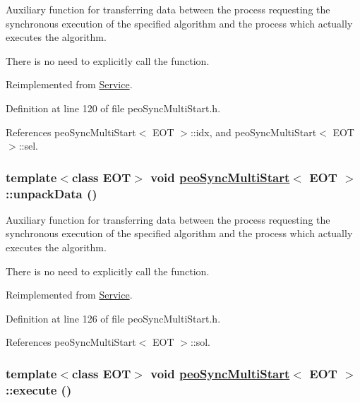 Auxiliary function for transferring data between the process requesting the synchronous execution of the specified algorithm and the process which actually executes the algorithm. 

There is no need to explicitly call the function. 

Reimplemented from \hyperlink{classService_aea4b8f7f8fb88e83862ee4bfd9ab207}{Service}.

Definition at line 120 of file peo\-Sync\-Multi\-Start.h.

References peo\-Sync\-Multi\-Start$<$ EOT $>$::idx, and peo\-Sync\-Multi\-Start$<$ EOT $>$::sel.\hypertarget{classpeoSyncMultiStart_2903a441b77cded266b5fb651e17a5b5}{
\subsubsection[unpackData]{\setlength{\rightskip}{0pt plus 5cm}template$<$class EOT$>$ void \hyperlink{classpeoSyncMultiStart}{peo\-Sync\-Multi\-Start}$<$ EOT $>$::unpack\-Data ()}}
\label{classpeoSyncMultiStart_2903a441b77cded266b5fb651e17a5b5}


Auxiliary function for transferring data between the process requesting the synchronous execution of the specified algorithm and the process which actually executes the algorithm. 

There is no need to explicitly call the function. 

Reimplemented from \hyperlink{classService_3bd87b444710813d30fd754d4d0b4df3}{Service}.

Definition at line 126 of file peo\-Sync\-Multi\-Start.h.

References peo\-Sync\-Multi\-Start$<$ EOT $>$::sol.\hypertarget{classpeoSyncMultiStart_a4d1c2943c290de540800087b54dc49b}{
\subsubsection[execute]{\setlength{\rightskip}{0pt plus 5cm}template$<$class EOT$>$ void \hyperlink{classpeoSyncMultiStart}{peo\-Sync\-Multi\-Start}$<$ EOT $>$::execute ()}}
\label{classpeoSyncMultiStart_a4d1c2943c290de540800087b54dc49b}


